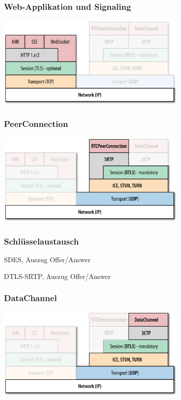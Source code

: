 \documentclass[12pt]{beamer}
\begin{document}
\begin{frame}
  \frametitle{Web-Applikation und Signaling}
  \centerline{\includegraphics[width=0.7\textwidth]{img/stack_oreilly_signaling.png}}
\end{frame}

\begin{frame}
  \frametitle{PeerConnection}
  \centerline{\includegraphics[width=0.7\textwidth]{img/stack_oreilly_pc.png}}
\end{frame}

\begin{frame}
  \frametitle{Schlüsselaustausch}
  \pause
  
  \hfill \tiny SDES, Auszug Offer/Answer
  \vspace{15pt} \\
  \pause
  
  \hfill \tiny DTLS-SRTP, Auszug Offer/Answer
\end{frame}

\begin{frame}
  \frametitle{DataChannel}
  \centerline{\includegraphics[width=0.7\textwidth]{img/stack_oreilly_datachannels.png}}
\end{frame}
\end{document}
